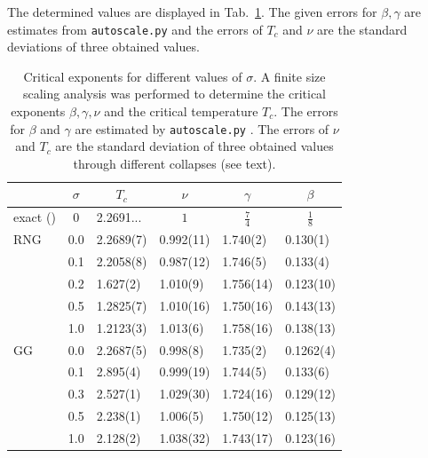     The determined values are displayed in Tab.\ \ref{tab:critExp}.
    The given errors for \(\beta, \gamma\) are estimates from \texttt{autoscale.py}
    and the errors of \(T_c\) and \(\nu\) are the standard deviations of
    three obtained values.\\
    \begin{table}[htbp]
        \center
        \begin{tabular}{l l l l l l}
            \toprule
             & \multicolumn{1}{c}{\(\sigma\)} & \multicolumn{1}{c}{\(T_c\)} & \multicolumn{1}{c}{\(\nu\)} & \multicolumn{1}{c}{\(\gamma\)} & \multicolumn{1}{c}{\(\beta\)}\\
            \midrule
            exact (\cite[p. 59]{Pelissetto2002}) & \multicolumn{1}{c}{\(0\)} & 2.2691... & \multicolumn{1}{c}{\(1\)} & \multicolumn{1}{c}{\(\frac{7}{4}\)} & \multicolumn{1}{c}{\(\frac{1}{8}\)}\\
            \midrule
            RNG          & 0.0 & 2.2689(7)& 0.992(11)& 1.740(2) & 0.130(1) \\
                         & 0.1 & 2.2058(8)& 0.987(12)& 1.746(5) & 0.133(4) \\
                         & 0.2 & 1.627(2) & 1.010(9) & 1.756(14)& 0.123(10)\\
                         & 0.5 & 1.2825(7)& 1.010(16)& 1.750(16)& 0.143(13)\\
                         & 1.0 & 1.2123(3)& 1.013(6) & 1.758(16)& 0.138(13)\\
            \midrule
            GG           & 0.0 & 2.2687(5)& 0.998(8) & 1.735(2) & 0.1262(4)\\
                         & 0.1 & 2.895(4) & 0.999(19)& 1.744(5) & 0.133(6) \\
                         & 0.3 & 2.527(1) & 1.029(30)& 1.724(16)& 0.129(12)\\
                         & 0.5 & 2.238(1) & 1.006(5) & 1.750(12)& 0.125(13)\\
                         & 1.0 & 2.128(2) & 1.038(32)& 1.743(17)& 0.123(16)\\

            \bottomrule
        \end{tabular}
        \caption[Critical Exponents for Different $\sigma$]{
            Critical exponents for different values of \(\sigma\). A finite size
            scaling analysis was performed to determine the critical
            exponents \(\beta, \gamma, \nu\) and the critical temperature
            \(T_c\). The errors for \(\beta\) and \(\gamma\) are estimated
            by \texttt{autoscale.py} \cite{autoscale2009}. The errors of
            \(\nu\) and \(T_c\) are the standard deviation of three obtained
            values through different collapses (see text).
        }
        \label{tab:critExp}
    \end{table}\\
